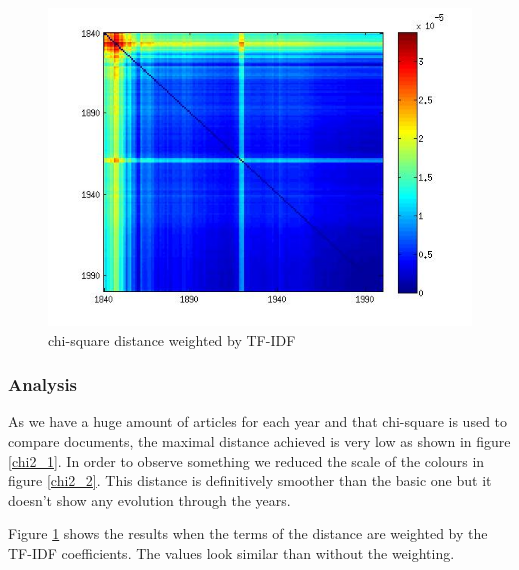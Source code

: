 \begin{figure}[H]
    \begin{minipage}[b]{0.48\linewidth}
        \includegraphics[scale=0.4]{Pictures/chi2/chi2_corrected_tfidf.jpg}
        \caption{chi-square distance weighted by TF-IDF}
        \label{chi2_tfidf}
    \end{minipage}\hfill
\end{figure}

\subsubsection{Analysis}

As we have a huge amount of articles for each year and that chi-square is used to compare documents, the maximal distance achieved is very low as shown in figure \ref{chi2_1}. In order to observe something we reduced the scale of the colours in figure \ref{chi2_2}. This distance is definitively smoother than the basic one but it doesn't show any evolution through the years.

Figure \ref{chi2_tfidf} shows the results when the terms of the distance are weighted by the TF-IDF coefficients. The values look similar than without the weighting.